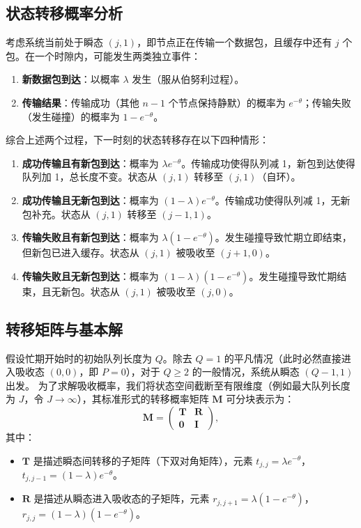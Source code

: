 \subsection{状态转移概率分析}

考虑系统当前处于瞬态 $(j, 1)$，即节点正在传输一个数据包，且缓存中还有 $j$ 个包。在一个时隙内，可能发生两类独立事件：
\begin{enumerate}
	\item \textbf{新数据包到达}：以概率 $\lambda$ 发生（服从伯努利过程）。
	\item \textbf{传输结果}：传输成功（其他 $n-1$ 个节点保持静默）的概率为 $e^{-\theta}$；传输失败（发生碰撞）的概率为 $1 - e^{-\theta}$。
\end{enumerate}

综合上述两个过程，下一时刻的状态转移存在以下四种情形：

\begin{enumerate}
	\item \textbf{成功传输且有新包到达}：概率为 $\lambda e^{-\theta}$。传输成功使得队列减 1，新包到达使得队列加 1，总长度不变。状态从 $(j, 1)$ 转移至 $(j, 1)$（自环）。
	\item \textbf{成功传输且无新包到达}：概率为 $(1-\lambda)e^{-\theta}$。传输成功使得队列减 1，无新包补充。状态从 $(j, 1)$ 转移至 $(j-1, 1)$。
	\item \textbf{传输失败且有新包到达}：概率为 $\lambda(1-e^{-\theta})$。发生碰撞导致忙期立即结束，但新包已进入缓存。状态从 $(j, 1)$ 被吸收至 $(j+1, 0)$。
	\item \textbf{传输失败且无新包到达}：概率为 $(1-\lambda)(1-e^{-\theta})$。发生碰撞导致忙期结束，且无新包。状态从 $(j, 1)$ 被吸收至 $(j, 0)$。
\end{enumerate}

\subsection{转移矩阵与基本解}

假设忙期开始时的初始队列长度为 $Q$。除去 $Q=1$ 的平凡情况（此时必然直接进入吸收态 $(0,0)$，即 $P=0$），对于 $Q \ge 2$ 的一般情况，系统从瞬态 $(Q-1, 1)$ 出发。
为了求解吸收概率，我们将状态空间截断至有限维度（例如最大队列长度为 $J$，令 $J \to \infty$），其标准形式的转移概率矩阵 $\mathbf{M}$ 可分块表示为：
\begin{equation}
	\mathbf{M} = 
	\left(
	\begin{array}{cc}
		\mathbf{T} & \mathbf{R} \\
		\mathbf{0} & \mathbf{I}
	\end{array}
	\right),
\end{equation}
其中：
\begin{itemize}
	\item $\mathbf{T}$ 是描述瞬态间转移的子矩阵（下双对角矩阵），元素 $t_{j,j} = \lambda e^{-\theta}$，$t_{j, j-1} = (1-\lambda)e^{-\theta}$。
	\item $\mathbf{R}$ 是描述从瞬态进入吸收态的子矩阵，元素 $r_{j, j+1} = \lambda(1-e^{-\theta})$，$r_{j, j} = (1-\lambda)(1-e^{-\theta})$。
\end{itemize}

